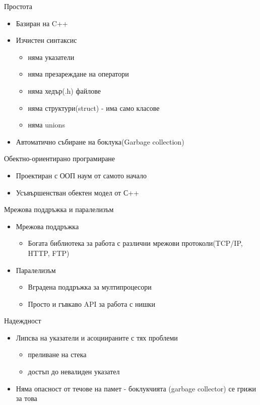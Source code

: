 \documentclass{beamer}
\begin{document}
\begin{frame}{Простота}
  \transdissolve  
  \begin{itemize}
    \item Базиран на C++ \pause
    \item Изчистен синтаксис \pause
      \begin{itemize}
        \item няма указатели \pause
        \item няма презареждане на оператори \pause
        \item няма хедър(.h) файлове \pause
        \item няма структури(struct) - има само класове \pause
        \item няма unions
      \end{itemize}
      \pause
    \item Автоматично събиране на боклука(Garbage collection)
  \end{itemize}
\end{frame}

\begin{frame}{Обектно-ориентирано програмиране}
  \transdissolve
  \begin{itemize}
  \item Проектиран с ООП наум от самото начало \pause
  \item Усъвършенстван обектен модел от С++
  \end{itemize}
\end{frame}

\begin{frame}{Мрежова поддръжка и паралелизъм}
  \transdissolve
  \begin{itemize}
  \item Мрежова поддръжка
  \begin{itemize}
  \item Богата библиотека за работа с различни
    мрежови протоколи(TCP/IP, HTTP, FTP)
  \end{itemize}
  \pause
  \item Паралелизъм
    \begin{itemize}
    \item Вградена поддръжка за мултипроцесори
    \item Просто и гъвкаво API за работа с нишки
    \end{itemize}
  \end{itemize}
\end{frame}

\begin{frame}{Надеждност}
  \transdissolve
  \begin{itemize}
    \item Липсва на указатели и асоциираните с
    тях проблеми
    \begin{itemize}
      \item преливане на стека
      \item достъп до невалиден указател
    \end{itemize} 
    \pause
    \item Няма опасност от течове на памет - боклукчията 
    (garbage collector) се грижи за това
  \end{itemize}
\end{frame}
\end{document}
